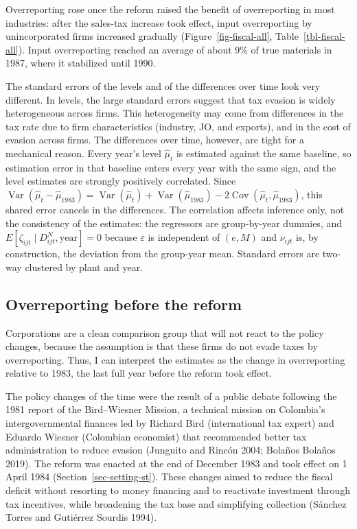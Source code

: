 \documentclass[
  12pt,
  letterpaper,
  oneside,
  openany]{report}
\begin{document}
Overreporting rose once the reform raised the benefit of overreporting
in most industries: after the sales-tax increase took effect, input
overreporting by unincorporated firms increased gradually
(Figure~\ref{fig-fiscal-all}, Table~\ref{tbl-fiscal-all}). Input
overreporting reached an average of about 9\% of true materials in 1987,
where it stabilized until 1990.

The standard errors of the levels and of the differences over time look
very different. In levels, the large standard errors suggest that tax
evasion is widely heterogeneous across firms. This heterogeneity may
come from differences in the tax rate due to firm characteristics
(industry, JO, and exports), and in the cost of evasion across firms.
The differences over time, however, are tight for a mechanical reason.
Every year's level \(\hat\mu_t\) is estimated against the same baseline,
so estimation error in that baseline enters every year with the same
sign, and the level estimates are strongly positively correlated. Since
\(\operatorname{Var}(\hat\mu_t-\hat\mu_{1983})=\operatorname{Var}(\hat\mu_t)+\operatorname{Var}(\hat\mu_{1983})-2\operatorname{Cov}(\hat\mu_t,\hat\mu_{1983})\),
this shared error cancels in the differences. The correlation affects
inference only, not the consistency of the estimates: the regressors are
group-by-year dummies, and
\(E[\zeta_{ijt}\mid D^N_{ijt},\text{year}]=0\) because \(\varepsilon\)
is independent of \((e,M)\) and \(\nu_{ijt}\) is, by construction, the
deviation from the group-year mean. Standard errors are two-way
clustered by plant and year.

\subsection{Overreporting before the reform}\label{sec-fiscal-pre}

Corporations are a clean comparison group that will not react to the
policy changes, because the assumption is that these firms do not evade
taxes by overreporting. Thus, I can interpret the estimates as the
change in overreporting relative to 1983, the last full year before the
reform took effect.

The policy changes of the time were the result of a public debate
following the 1981 report of the Bird--Wiesner Mission, a technical
mission on Colombia's intergovernmental finances led by Richard Bird
(international tax expert) and Eduardo Wiesner (Colombian economist)
that recommended better tax administration to reduce evasion (Junguito
and Rincón 2004; Bolaños Bolaños 2019). The reform was enacted at the
end of December 1983 and took effect on 1 April 1984
(Section~\ref{sec-setting-st}). These changes aimed to reduce the fiscal
deficit without resorting to money financing and to reactivate
investment through tax incentives, while broadening the tax base and
simplifying collection (Sánchez Torres and Gutiérrez Sourdis 1994).
\end{document}
